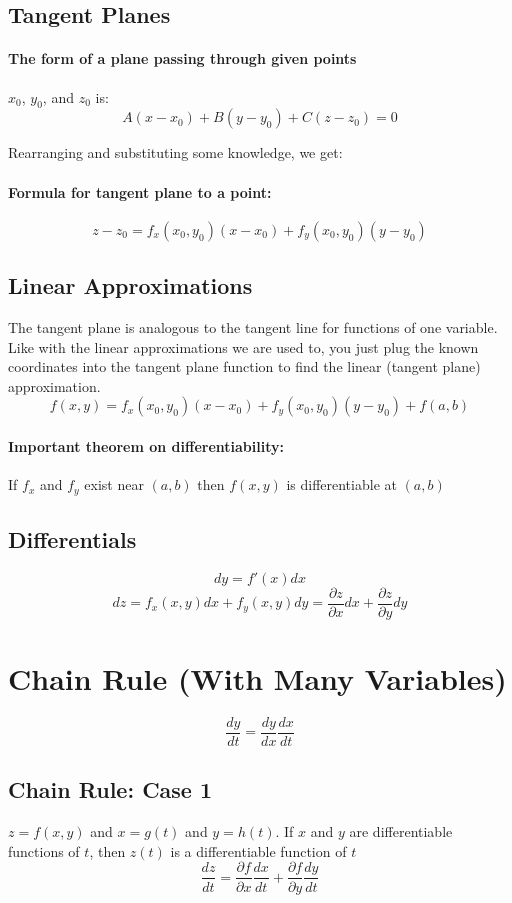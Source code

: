 \documentclass[a4paper,12pt]{report}
\begin{document}
\subsection{Tangent Planes}
\paragraph{The form of a plane passing through given points } $x_0$, $y_0$, and $z_0$ is:
$$A(x-x_0) + B(y-y_0) + C(z-z_0) = 0$$

Rearranging and substituting some knowledge, we get:
\paragraph{Formula for tangent plane to a point: }
$$z - z_0 = f_{x}(x_0, y_0) (x-x_0) + f_y(x_0, y_0)(y-y_0)$$

\subsection{Linear Approximations}
The tangent plane is analogous to the tangent line for functions of one variable. Like with the linear approximations we are used to, you just plug the known coordinates into the tangent plane function to find the linear (tangent plane) approximation.
$$f(x, y) = f_{x}(x_0, y_0)(x-x_0) + f_y(x_0, y_0)(y-y_0) + f(a, b)$$

\paragraph{Important theorem on differentiability: } If $f_x$ and $f_y$ exist near $(a, b)$ then $f(x, y)$ is differentiable at $(a, b)$

\subsection{Differentials}
$$dy = f'(x) dx$$
$$dz = f_x(x, y)dx + f_y(x, y)dy = \frac{\partial z}{\partial x} dx + \frac{\partial z}{\partial y}dy$$

\section{Chain Rule (With Many Variables)}
$$\frac{dy}{dt} = \frac{dy}{dx} \frac{dx}{dt}$$

\subsection{Chain Rule: Case 1}
$z = f(x, y)$ and $x = g(t)$ and $y = h(t)$. If $x$ and $y$ are differentiable functions of $t$, then $z(t)$ is a differentiable function of $t$
$$\frac{dz}{dt} = \frac{\partial f}{\partial x} \frac{dx}{dt} + \frac{\partial f}{\partial y} \frac{dy}{dt}$$
\end{document}
